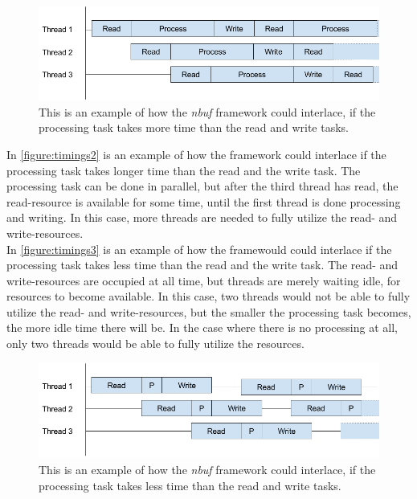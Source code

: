 \documentclass[a4paper]{article}
\newcommand{\nbuf}{\textit{nbuf} }
\begin{document}
\begin{figure}
	\begin{adjustwidth}{-0.5in}{-0.5in}
    \centering
     \includegraphics[scale=0.5]{figures/timings2.png}
  	\caption{This is an example of how the \nbuf framework could interlace, if the processing task takes more time than the read and write tasks.}
	\label{figure:timings2}
	\end{adjustwidth}
\end{figure}

In \autoref{figure:timings2} is an example of how the framework could interlace if the processing task takes longer time than the read and the write task. The processing task can be done in parallel, but after the third thread has read, the read-resource is available for some time, until the first thread is done processing and writing. In this case, more threads are needed to fully utilize the read- and write-resources.\\


In \autoref{figure:timings3} is an example of how the framewould could interlace if the processing task takes less time than the read and the write task. The read- and write-resources are occupied at all time, but threads are merely waiting idle, for resources to become available. In this case, two threads would not be able to fully utilize the read- and write-resources, but the smaller the processing task becomes, the more idle time there will be. In the case where there is no processing at all, only two threads would be able to fully utilize the resources. \\

\begin{figure}
	\begin{adjustwidth}{-0.5in}{-0.5in}
    \centering
     \includegraphics[scale=0.5]{figures/timings3.png}
  	\caption{This is an example of how the \nbuf framework could interlace, if the processing task takes less time than the read and write tasks.}
	\label{figure:timings3}
	\end{adjustwidth}
\end{figure}
\end{document}
